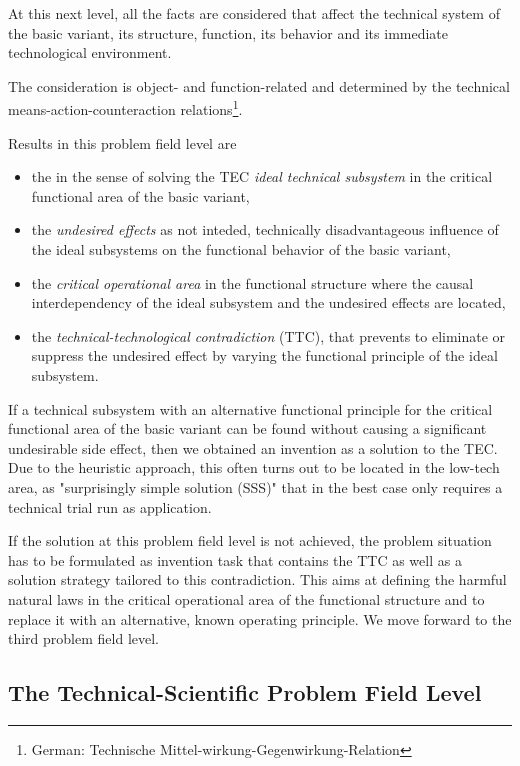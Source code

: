 \documentclass[11pt,a4paper]{article}
\begin{document}
At this next level, all the facts are considered that affect the technical
system of the basic variant, its structure, function, its behavior and its
immediate technological environment.

The consideration is object- and function-related and determined by the
technical means-action-counteraction relations\footnote{German: Technische
  Mittel-wirkung-Gegenwirkung-Relation}.

Results in this problem field level are
\begin{itemize}
\item the in the sense of solving the TEC \emph{ideal technical subsystem} in
  the critical functional area of the basic variant,
\item the \emph{undesired effects} as not inteded, technically disadvantageous
  influence of the ideal subsystems on the functional behavior of the basic
  variant,
\item the \emph{critical operational area} in the functional structure where
  the causal interdependency of the ideal subsystem and the undesired effects
  are located,
\item the \emph{technical-technological contradiction} (TTC), that prevents to
  eliminate or suppress the undesired effect by varying the functional
  principle of the ideal subsystem.
\end{itemize}
If a technical subsystem with an alternative functional principle for the
critical functional area of the basic variant can be found without causing a
significant undesirable side effect, then we obtained an invention as a
solution to the TEC. Due to the heuristic approach, this often turns out to be
located in the low-tech area, as "surprisingly simple solution (SSS)" that in
the best case only requires a technical trial run as application.

If the solution at this problem field level is not achieved, the problem
situation has to be formulated as invention task that contains the TTC as well
as a solution strategy tailored to this contradiction. This aims at defining
the harmful natural laws in the critical operational area of the functional
structure and to replace it with an alternative, known operating principle.
We move forward to the third problem field level.

\subsection{The Technical-Scientific Problem Field Level}
\end{document}
